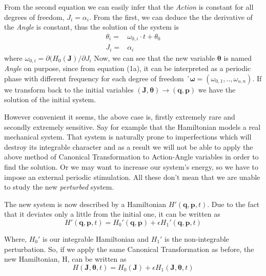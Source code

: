 	From the second equation we can easily infer that the \textit{Action} is constant for all degrees of freedom, $J_i =\alpha_i$. From the first, we can deduce the the derivative of the \textit{Angle} is constant, thus the solution of the system is 
	\begin{subequations}\label{eq3}
		\begin{alignat}{2}
			\theta_i =& \omega_{0,i} \cdot t + \theta_0 \\ 
			J_i      =& \alpha_i
		\end{alignat}
	\end{subequations}
 	where $\omega_{0,i} = \partial(H_0(\bm{J})/\partial{J_i}$	
	Now, we can see that the new variable $\bm{\theta}$ is named \textit{Angle} on purpose, since from equation (1a), it can be interpreted as a periodic phase with different frequency for each degree of freedom ´$\bm{\omega} = (\omega_{0,1},..,\omega_{o,n})$.
	If we transform back to the initial variables $(\bm{J},\bm{\theta})\rightarrow(\bm{q},\bm{p})$ we have the solution of the initial system.
	
	However convenient it seems, the above case is, firstly extremely rare and secondly extremely sensitive. Say for example that the Hamiltonian models a real mechanical system. That system is naturally prone to imperfections which will destroy its integrable character and as a result we will not be able to apply the above method of Canonical Transformation to Action-Angle variables in order to find the solution. Or we may want to increase our system's energy, so we have to impose an external periodic stimulation.
	All these don't mean that we are unable to study the new \textit{perturbed} system.
	
	The new system is now described by a Hamiltonian $H'(\bm{q},\bm{p},t)$. Due to the fact that it deviates only a little from the initial one, it can be written as 
		\begin{equation}\label{eq4}
			H'(\bm{q},\bm{p},t) = H_0'(\bm{q},\bm{p}) + \epsilon H_1'(\bm{q},\bm{p},t) 
		\end{equation}
	
	Where, $H_0'$ is our integrable Hamiltonian and $H_1'$ is the non-integrable perturbation. So, if we apply the same Canonical Transformation as before, the new Hamiltonian, H, can be written as 
		\begin{equation}\label{eq5}
			H(\bm{J},\bm{\theta},t) = H_0(\bm{J}) + \epsilon H_1(\bm{J},\bm{\theta},t)
		\end{equation}
	
